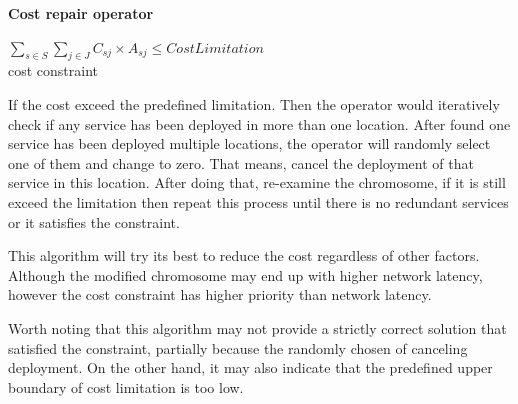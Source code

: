 \documentclass[twoside]{article}
\begin{document}
\begin{flushleft}\textbf{Cost repair operator}\end{flushleft}
	\begin{center} 
		$\sum\limits_{s \in S} \sum\limits_{j \in J} C_{sj} \times A_{sj} \leq CostLimitation$ \\
		cost constraint
\end{center}

If the cost exceed the predefined limitation. Then the operator would iteratively check if any service has 
been deployed in more than one location. After found one service has been deployed multiple locations, 
the operator will randomly select one of them and change to zero. That means, cancel the deployment of 
that service in this location. After doing that, re-examine the chromosome, if it is still exceed the 
limitation then repeat this process until there is no redundant services or it satisfies the constraint.

This algorithm will try its best to reduce the cost regardless of other factors. Although the modified 
chromosome may end up with higher network latency, however the cost constraint has higher priority than network latency.

Worth noting that this algorithm may not provide a strictly correct solution that satisfied the constraint, 
partially because the randomly chosen of canceling deployment. On the other hand, it may also indicate that 
the predefined upper boundary of cost limitation is too low.





\end{document}
